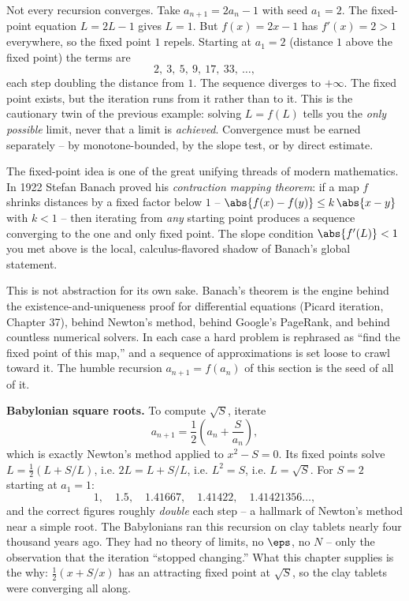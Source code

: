 \begin{example}
\label{ch28:ex-divergent-recursion}
Not every recursion converges. Take $a_{n+1} = 2a_n - 1$ with seed $a_1 = 2$. The
fixed-point equation $L = 2L - 1$ gives $L = 1$. But $f(x) = 2x - 1$ has $f'(x) =
2 > 1$ everywhere, so the fixed point $1$ repels. Starting at $a_1 = 2$ (distance
$1$ above the fixed point) the terms are
\[
  2,\ 3,\ 5,\ 9,\ 17,\ 33,\ \dots,
\]
each step doubling the distance from $1$. The sequence diverges to $+\infty$. The
fixed point exists, but the iteration runs from it rather than to it. This is the
cautionary twin of the previous example: solving $L = f(L)$ tells you the
\emph{only possible} limit, never that a limit is \emph{achieved}. Convergence
must be earned separately -- by monotone-bounded, by the slope test, or by direct
estimate.
\end{example}

\begin{historybox}
The fixed-point idea is one of the great unifying threads of modern mathematics.
In 1922 Stefan Banach proved his \emph{contraction mapping theorem}: if a map $f$
shrinks distances by a fixed factor below $1$ -- $\abs{f(x) - f(y)} \le k\,
\abs{x-y}$ with $k < 1$ -- then iterating from \emph{any} starting point produces
a sequence converging to the one and only fixed point. The slope condition
$\abs{f'(L)} < 1$ you met above is the local, calculus-flavored shadow of
Banach's global statement.

This is not abstraction for its own sake. Banach's theorem is the engine behind
the existence-and-uniqueness proof for differential equations (Picard
iteration, Chapter 37), behind Newton's method, behind Google's PageRank, and
behind countless numerical solvers. In each case a hard problem is rephrased as
``find the fixed point of this map,'' and a sequence of approximations is set
loose to crawl toward it. The humble recursion $a_{n+1} = f(a_n)$ of this section
is the seed of all of it.
\end{historybox}

\begin{applicationbox}
\textbf{Babylonian square roots.} To compute $\sqrt{S}$, iterate
\[
  a_{n+1} = \frac12\left(a_n + \frac{S}{a_n}\right),
\]
which is exactly Newton's method applied to $x^2 - S = 0$. Its fixed points solve
$L = \tfrac12(L + S/L)$, i.e. $2L = L + S/L$, i.e. $L^2 = S$, i.e. $L = \sqrt S$.
For $S = 2$ starting at $a_1 = 1$:
\[
  1,\quad 1.5,\quad 1.41667,\quad 1.41422,\quad 1.41421356\ldots,
\]
and the correct figures roughly \emph{double} each step -- a hallmark of Newton's
method near a simple root. The Babylonians ran this recursion on clay tablets
nearly four thousand years ago. They had no theory of limits, no $\eps$, no $N$ --
only the observation that the iteration ``stopped changing.'' What this chapter
supplies is the why: $\tfrac12(x + S/x)$ has an attracting fixed point at
$\sqrt S$, so the clay tablets were converging all along.
\end{applicationbox}

